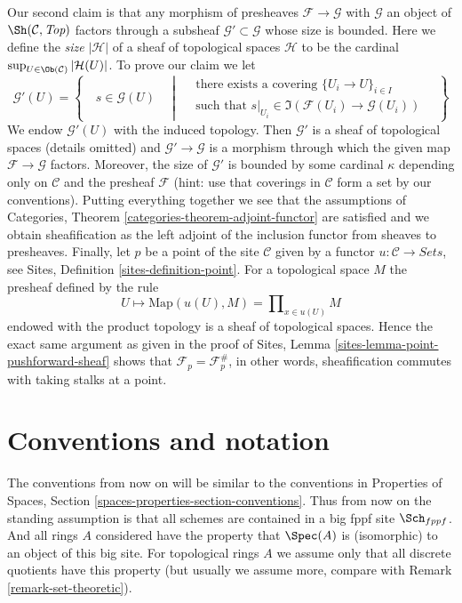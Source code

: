 \begin{remark}
Our second claim is that any morphism of presheaves
$\mathcal{F} \to \mathcal{G}$ with $\mathcal{G}$ an object of
$\Sh(\mathcal{C}, \textit{Top})$ factors through a subsheaf
$\mathcal{G}' \subset \mathcal{G}$ whose size is bounded.
Here we define the {\it size} $|\mathcal{H}|$
of a sheaf of topological spaces $\mathcal{H}$ to be the cardinal
$\sup_{U \in \Ob(\mathcal{C})} |\mathcal{H}(U)|$.
To prove our claim we let
$$
\mathcal{G}'(U) =
\left\{
\quad
s \in \mathcal{G}(U)
\quad \middle| \quad
\begin{matrix}
\text{there exists a covering }\{U_i \to U\}_{i \in I} \\
\text{such that }
s|_{U_i} \in \Im(\mathcal{F}(U_i) \to \mathcal{G}(U_i))
\end{matrix}
\quad
\right\}
$$
We endow $\mathcal{G}'(U)$ with the induced topology.
Then $\mathcal{G}'$ is a sheaf of topological spaces (details omitted)
and $\mathcal{G}' \to \mathcal{G}$ is a morphism through which
the given map $\mathcal{F} \to \mathcal{G}$ factors. Moreover,
the size of $\mathcal{G}'$ is bounded by some cardinal
$\kappa$ depending only on $\mathcal{C}$ and the presheaf $\mathcal{F}$
(hint: use that coverings in $\mathcal{C}$
form a set by our conventions). Putting everything together we see
that the assumptions of Categories, Theorem
\ref{categories-theorem-adjoint-functor}
are satisfied and we obtain sheafification as the left
adjoint of the inclusion functor from sheaves to presheaves.
Finally, let $p$ be a point of the
site $\mathcal{C}$ given by a functor $u : \mathcal{C} \to \textit{Sets}$,
see Sites, Definition \ref{sites-definition-point}.
For a topological space $M$ the presheaf defined by the rule
$$
U \mapsto \text{Map}(u(U), M) = \prod\nolimits_{x \in u(U)} M
$$
endowed with the product topology is a sheaf of topological spaces.
Hence the exact same argument as given in the proof of
Sites, Lemma \ref{sites-lemma-point-pushforward-sheaf} shows that
$\mathcal{F}_p = \mathcal{F}^\#_p$, in other words, sheafification
commutes with taking stalks at a point.
\end{remark}




\section{Conventions and notation}
\label{section-conventions}

\noindent
The conventions from now on will be similar to the conventions in
Properties of Spaces, Section \ref{spaces-properties-section-conventions}.
Thus from now on the standing assumption is that all schemes are contained
in a big fppf site $\Sch_{fppf}$. And all rings $A$ considered have the
property that $\Spec(A)$ is (isomorphic) to an object of this big site.
For topological rings $A$ we assume only that all discrete quotients have
this property (but usually we assume more, compare with
Remark \ref{remark-set-theoretic}).

